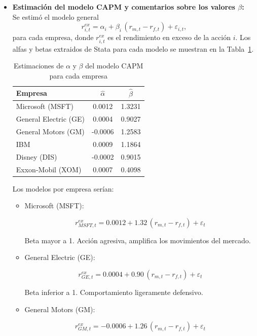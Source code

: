 \documentclass[12pt]{article}
\begin{document}
\begin{itemize}
  \item \textbf{Estimación del modelo CAPM y comentarios sobre los valores $\beta$:} \\
  Se estimó el modelo general
  \[
    r_{i,t}^{ex} = \alpha_i + \beta_i \,(r_{m,t} - r_{f,t}) + \varepsilon_{i,t},
  \]
  para cada empresa, donde $r_{i,t}^{ex}$ es el rendimiento en exceso de la acción $i$. Los alfas y betas extraidos de Stata para cada modelo se muestran en la Tabla~\ref{tab:capm}. 

\begin{table}[h!]
\centering
\caption{Estimaciones de $\alpha$ y $\beta$ del modelo CAPM para cada empresa}
\label{tab:capm}
\begin{tabular}{lcc}
\hline
\textbf{Empresa} & \textbf{$\hat{\alpha}$} & \textbf{$\hat{\beta}$} \\
\hline
Microsoft (MSFT)      & 0.0012 & 1.3231 \\
General Electric (GE) & 0.0004 & 0.9027 \\
General Motors (GM)   & -0.0006 & 1.2583 \\
IBM                   & 0.0009 & 1.1864 \\
Disney (DIS)          & -0.0002 & 0.9015 \\
Exxon-Mobil (XOM)     & 0.0007 & 0.4098 \\
\hline
\end{tabular}
\end{table}

Los modelos por empresa serían:

  \begin{itemize}
    \item Microsoft (MSFT): 
    
    \[
      r_{MSFT,t}^{ex} = 0.0012 + 1.32 \,(r_{m,t} - r_{f,t}) + \varepsilon_t
    \] 
    
    Beta mayor a 1. Acción agresiva, amplifica los movimientos del mercado.
    
    \item General Electric (GE): 
    
    \[
      r_{GE,t}^{ex} = 0.0004 + 0.90 \,(r_{m,t} - r_{f,t}) + \varepsilon_t
    \] 
    
    Beta inferior a 1. Comportamiento ligeramente defensivo.
    
    \item General Motors (GM): 
    
    \[
      r_{GM,t}^{ex} = -0.0006 + 1.26 \,(r_{m,t} - r_{f,t}) + \varepsilon_t
    \] 
    

\end{itemize}
\end{itemize}
\end{document}

